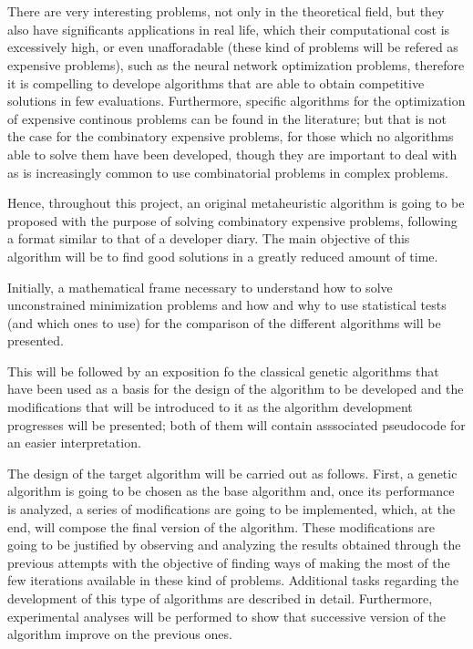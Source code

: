 \\

\vspace{0.7cm}
\\

There are very interesting problems, not only in the theoretical field, but they also have significants applications in real life, which their computational cost is excessively high, or even unafforadable (these kind of problems will be refered as expensive problems), such as the neural network optimization problems, therefore it is compelling to develope algorithms that are able to obtain competitive solutions in few evaluations. 
Furthermore, specific algorithms for the optimization of expensive continous problems can be found in the literature; but that is not the case for the combinatory expensive problems, for those which no algorithms able to solve them have been developed, though they are important to deal with as is increasingly common to use combinatorial problems in complex problems.

Hence, throughout this project, an original metaheuristic algorithm is going to be proposed with the purpose of solving combinatory expensive problems, following a format similar to that of a developer diary. 
The main objective of this algorithm will be to find good solutions in a greatly reduced amount of  time. 

Initially, a mathematical frame necessary to understand how to solve unconstrained minimization problems and how and why to use statistical tests (and which ones to use) for the comparison of the different algorithms will be presented. 

This will be followed by an exposition fo the classical genetic algorithms that have been used as a basis for the design of the algorithm to be developed and the modifications that will be introduced to it as the algorithm development progresses will be presented; both of them will contain asssociated pseudocode for an easier interpretation. 

The design of the target algorithm will be carried out as follows. 
First, a genetic algorithm is going to be chosen as the base algorithm and, once its performance is analyzed, a series of modifications are going  to be implemented, which, at the end, will compose the final version of the algorithm. 
These modifications are going to be justified by observing and analyzing the results obtained through the previous attempts with the objective of finding ways of making the most of the few iterations available in these kind of problems. 
Additional tasks regarding the development of this type of algorithms are described in detail. 
Furthermore, experimental analyses will be performed to show that successive version of the algorithm improve on the previous ones. 

